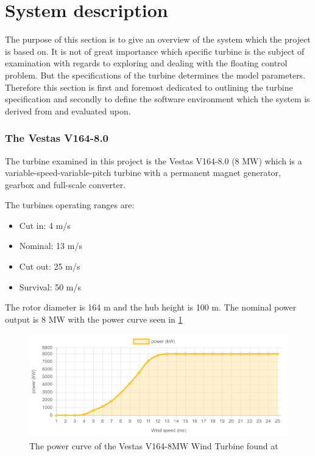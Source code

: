 \section{System description} \label{sec:sys-descr}
The purpose of this section is to give an overview of the system which the project is based on. It is not of great importance which specific turbine is the subject of examination with regards to exploring and dealing with the floating control problem. But the specifications of the turbine determines the model parameters. Therefore this section is first and foremost dedicated to outlining the turbine specification and secondly to define the software environment which the system is derived from and evaluated upon. 

\subsubsection{The Vestas V164-8.0}
The turbine examined in this project is the Vestas V164-8.0 (8 MW) which is a variable-speed-variable-pitch turbine with a permanent magnet generator, gearbox and full-scale converter.

The turbines operating ranges are:
\begin{itemize}
	\item Cut in: 4 m/s
	\item Nominal: 13 m/s
	\item Cut out: 25 m/s
	\item Survival: 50 m/s
\end{itemize}
The rotor diameter is 164 m and the hub height is 100 m. The nominal power output is 8 MW with the power curve seen in \cref{fig:v164_8mw_pc}
\begin{figure}[ht]
	\centering	\includegraphics[width=0.95\linewidth]{Graphics/v164-8mw_powerCurve.PNG}
	\caption{The power curve of the Vestas V164-8MW Wind Turbine found at \cite{LucasBauer}}
	\label{fig:v164_8mw_pc}
\end{figure}

